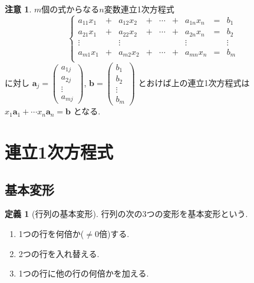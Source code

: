 \documentclass[dvipdfmx,a4paper,11pt]{article}
\theoremstyle{definition}
\newtheorem{dfn}[thm]{定義}
\newtheorem{rem}[thm]{注意}
\begin{document}
 \begin{rem}

 $m$個の式からなる$n$変数連立1次方程式
\begin{equation*}
\left\{ 
\begin{matrix}
a_{11}x_1&+& a_{12} x_2& +&\cdots &+&a_{1n}x_n &= &b_1 \\
a_{21}x_1&+& a_{22} x_2& +&\cdots &+&a_{2n}x_n &= &b_2 \\
\vdots		&& 	\vdots				 && 		& &\vdots&&\vdots	\\
a_{m1}x_1&+& a_{m2} x_2& +&\cdots &+&a_{mn}x_n &= &b_m \\
\end{matrix}
\right.
\end{equation*}
に対し
$\bm{a}_{j} = 
\begin{pmatrix}
a_{1j}\\a_{2j}\\ \vdots \\a_{mj}
 \end{pmatrix}
$, $\bm{b} =\begin{pmatrix}
b_1\\b_2\\\vdots\\b_m
\end{pmatrix}$
とおけば上の連立1次方程式は
$
x_1\bm{a}_1 + \cdots x_n\bm{a}_n = \bm{b}
$ となる. 
 \end{rem}
 
 
 \section{連立1次方程式 \cite[2章]{M}}
 \subsection{基本変形 \cite[2.1節]{M}}
  \begin{tcolorbox}[
    colback = white,
    colframe = green!35!black,
    fonttitle = \bfseries,
    breakable = true]
    \begin{dfn}[行列の基本変形]
 行列の次の3つの変形を基本変形という.
 \begin{enumerate}
   \setlength{\parskip}{0cm} 
  \setlength{\itemsep}{0cm}
  \item 1つの行を何倍か($\neq 0$倍)する.
 \item 2つの行を入れ替える.
 \item1つの行に他の行の何倍かを加える.
 \end{enumerate}
  \end{dfn}
  
 \end{tcolorbox} 
\end{document}
